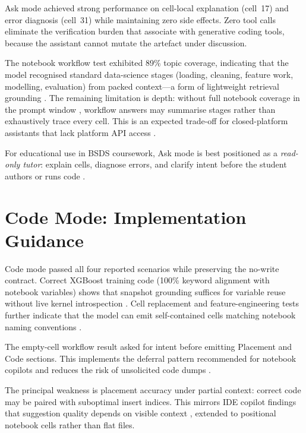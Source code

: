 Ask mode achieved strong performance on cell-local explanation (cell~17) and error diagnosis (cell~31) while maintaining zero side effects. Zero tool calls eliminate the verification burden that \textcite{vaithilingam2022expectation} associate with generative coding tools, because the assistant cannot mutate the artefact under discussion.

The notebook workflow test exhibited 89\% topic coverage, indicating that the model recognised standard data-science stages (loading, cleaning, feature work, modelling, evaluation) from packed context---a form of lightweight retrieval grounding \parencite{lewis2020rag}. The remaining limitation is depth: without full notebook coverage in the prompt window \parencite{wei2022chain,brown2020language}, workflow answers may summarise stages rather than exhaustively trace every cell. This is an expected trade-off for closed-platform assistants that lack platform \ac{API} access \parencite{chasins2018roussillon}.

For educational use in \acf{BSDS} coursework, Ask mode is best positioned as a \emph{read-only tutor}: explain cells, diagnose errors, and clarify intent before the student authors or runs code \parencite{finnieansley2022codex}.

\section{Code Mode: Implementation Guidance}

Code mode passed all four reported scenarios while preserving the no-write contract. Correct XGBoost training code (100\% keyword alignment with notebook variables) shows that snapshot grounding suffices for variable reuse without live kernel introspection \parencite{lewis2020rag}. Cell replacement and feature-engineering tests further indicate that the model can emit self-contained cells matching notebook naming conventions \parencite{wang2021welldocumented}.

The empty-cell workflow result asked for intent before emitting Placement and Code sections. This implements the deferral pattern recommended for notebook copilots \parencite{mcnutt2023notebookassistants} and reduces the risk of unsolicited code dumps \parencite{mozannar2024reading}.

The principal weakness is placement accuracy under partial context: correct code may be paired with suboptimal insert indices. This mirrors IDE copilot findings that suggestion quality depends on visible context \parencite{ziegler2024copilot}, extended to positional notebook cells rather than flat files.

